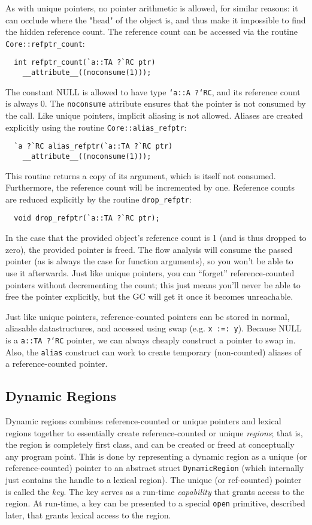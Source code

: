 As with unique pointers, no pointer arithmetic is allowed, for similar
reasons: it can occlude where the "head" of the object is, and thus make
it impossible to find the hidden reference count.  The reference count
can be accessed via the routine \texttt{Core::refptr_count}:
\begin{verbatim}
  int refptr_count(`a::TA ?`RC ptr)
    __attribute__((noconsume(1)));
\end{verbatim} %
The constant NULL is allowed to have type \texttt{`a::A ?`RC}, and its
reference count is always 0.  The \texttt{noconsume} attribute ensures that
the pointer is not consumed by the call.  Like unique pointers, implicit
aliasing is not allowed.  Aliases are created explicitly using the routine
\texttt{Core::alias_refptr}:
\begin{verbatim}
  `a ?`RC alias_refptr(`a::TA ?`RC ptr)
    __attribute__((noconsume(1)));
\end{verbatim} %
This routine returns a copy of its argument, which is itself not consumed.
Furthermore, the reference count will be incremented by one.  Reference
counts are reduced explicitly by the routine \texttt{drop_refptr}:
\begin{verbatim}
  void drop_refptr(`a::TA ?`RC ptr);
\end{verbatim}
In the case that the provided object's reference count is 1 (and is thus
dropped to zero), the provided pointer is freed.  The flow analysis will
consume the passed pointer (as is always the case for function arguments),
so you won't be able to use it afterwards.  Just like unique pointers, you
can ``forget'' reference-counted pointers without decrementing the count;
this just means you'll never be able to free the pointer explicitly, but the
GC will get it once it becomes unreachable.

Just like unique pointers, reference-counted pointers can be stored in
normal, aliasable datastructures, and accessed using swap (e.g. \texttt{x
:=: y}).  Because NULL is a \texttt{a::TA ?`RC} pointer, we can always
cheaply construct a pointer to swap in.  Also, the \texttt{alias} construct
can work to create temporary (non-counted) aliases of a reference-counted
pointer.

\subsection{Dynamic Regions}

Dynamic regions combines reference-counted or unique pointers and lexical
regions together to essentially create reference-counted or unique
\emph{regions}; that is, the region is completely first class, and can be
created or freed at conceptually any program point.  This is done by
representing a dynamic region as a unique (or reference-counted) pointer to
an abstract struct \texttt{DynamicRegion} (which internally just contains
the handle to a lexical region).  The unique (or ref-counted) pointer is
called the \emph{key}.  The key serves as a run-time \emph{capability} that
grants access to the region.  At run-time, a key can be presented to a
special \texttt{open} primitive, described later, that grants lexical access
to the region.
        
